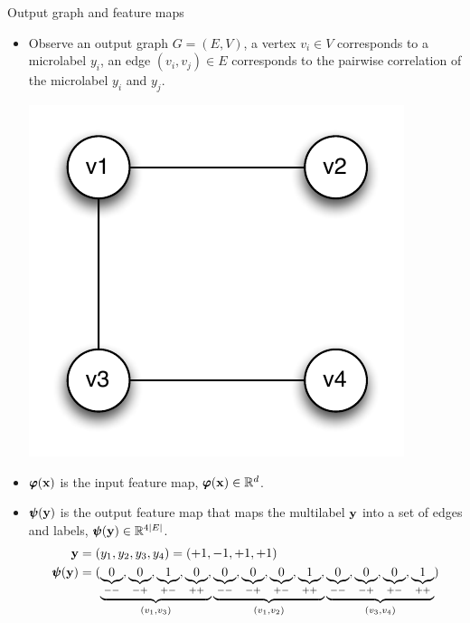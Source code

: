\documentclass[first=dgreen,second=purple,logo=yellowexc]{aaltoslides}
\begin{document}
{\begin{frame}{Output graph and feature maps}
	\begin{itemize}
		\item Observe an output graph $G=(E,V)$, a vertex $v_i\in V$ corresponds to a microlabel $y_i$, an edge $(v_i,v_j)\in E$ corresponds to the pairwise correlation of the microlabel $y_i$ and $y_j$.
		\begin{center}
			\includegraphics[scale=0.3]{./figures/outputgraph.pdf}
		\end{center}
		\item $\pmb \varphi(\mathbf {x})$ is the  input feature map, $\pmb \varphi(\mathbf {x})\in\mathbb{R}^d$.
		\item $\pmb \psi(\mathbf {y})$ is the output feature map that maps the multilabel $\mathbf {y}$ into a set of edges and labels, $\pmb \psi(\mathbf {y})\in\mathbb{R}^{4|E|}$.
		\begin{align*}
			\mathbf {y}&=(y_1,y_2,y_3,y_4)=(+1,-1,+1,+1)\\
			\pmb \psi(\mathbf {y}) &= ( \underbrace{\underbrace{0}_{--}, \underbrace{0}_{-+}, \underbrace{1}_{+-}, \underbrace{0}_{++},}_{(v_1,v_3)} 
			\underbrace{\underbrace{0}_{--}, \underbrace{0}_{-+}, \underbrace{0}_{+-}, \underbrace{1}_{++},}_{(v_1,v_2)}
			\underbrace{\underbrace{0}_{--}, \underbrace{0}_{-+}, \underbrace{0}_{+-}, \underbrace{1}_{++}}_{(v_3,v_4)})
		\end{align*}
	\end{itemize}
\end{frame}


}
\end{document}
